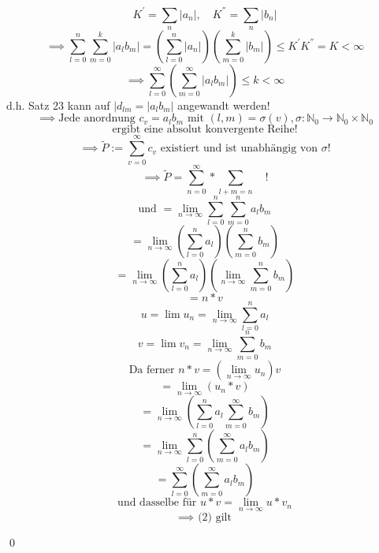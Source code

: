 \documentclass[fleqn]{scrbook}
\newcommand{\N}{\mathbb{N}}
\newcommand{\limN}[1][n]{\lim_{#1 \to \infty}}
\renewenvironment{proof}{{\bfseries Beweis }}{\qed}
\begin{document}
\begin{proof}
\[K^{'}=\sum_n |a_n|, \quad K^{''} = \sum_n |b_n|\]
\[\implies \sum_{l=0}^n \sum_{m=0}^k |a_l b_m| = \left( \sum_{l=0}^n |a_n| \right)\left( \sum_{m=0}^k |b_m| \right) \leq K^{'}K^{''} = K < \infty \]
\[\implies \sum_{l=0}^\infty \left( \sum_{m=0}^\infty |a_lb_m| \right) \leq k < \infty\]
d.h. Satz 23 kann auf $|d_{lm}=|a_lb_m|$ angewandt werden!
\[\implies \text{Jede anordnung } c_v = a_lb_m \text{ mit } (l,m) = \sigma(v), \sigma : \N_0 \to \N_0 \times \N_0 \]
\[\text{ergibt eine absolut konvergente Reihe!}\]
\[\implies \tilde{P} := \sum_{v=0}^\infty c_v \text{ existiert und ist unabhängig von } \sigma !\]
\[\implies \boxed{\tilde{P} = \sum_{n=0}^\infty * \sum_{l+m=n}} \quad !\]
\[\text{und } = \limN \sum_{l=0}^n \sum_{m=0}^n a_l b_m\]
\[= \limN \left( \sum_{l=0}^n a_l \right) \left( \sum_{m=0}^n b_m \right)\]
\[= \limN \left( \sum_{l=0}^n a_l \right) \left( \limN \sum_{m=0}^n b_m \right) \]
\[=n*v\]
\[u = \lim u_n = \limN \sum_{l=0}^n a_l\]
\[v = \lim v_n = \limN \sum_{m=0}^n b_m\]
\[\text{Da ferner } n*v = \left( \limN u_n \right)v\]
\[ = \limN (u_n*v)\]
\[ = \limN \left( \sum_{l=0}^n a_l \sum_{m=0}^\infty b_m \right) \]
\[ = \limN \sum_{l=0}^n \left( \sum_{m=0}^\infty a_lb_m \right) \]
\[ = \sum_{l=0}^\infty \left( \sum_{m=0}^\infty a_l b_m \right) \]
\[\text{und dasselbe für } u*v = \limN u*v_n\]
\[\implies \text{ (2) gilt}\]

\end{proof}
\end{document}
